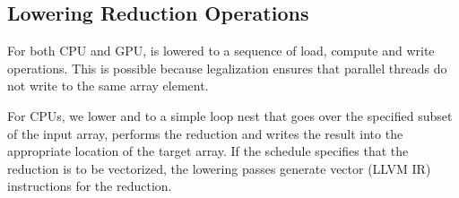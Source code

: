 \subsection{Lowering Reduction Operations}

For both CPU and GPU,  is lowered to a sequence 
of load, compute and write operations. This is possible because 
legalization ensures that parallel threads do not write to the same 
array element. 

For CPUs, we lower  and 
 to a simple loop nest that goes over the specified
subset of the input array, performs the reduction and writes 
the result into the appropriate location of the target array. 
If the schedule specifies that the reduction is to be vectorized,
the lowering passes generate vector (LLVM IR) instructions for 
the reduction.



